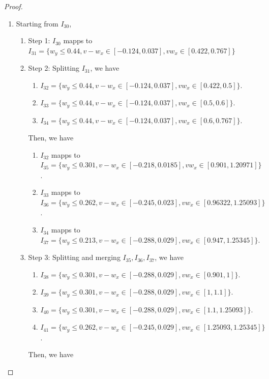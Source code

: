 \documentclass{article}
\theoremstyle{plain}
\theoremstyle{remark}
\begin{document}
\begin{proof}
\begin{enumerate}
    \item Starting from $I_{30}$,
        \begin{enumerate}
        \item Step 1: $I_{30}$ mapps to $I_{31}=\{w_y\le 0.44, v-w_x\in[-0.124, 0.037], vw_x \in[0.422, 0.767]\}$
        \item Step 2: Splitting $I_{31}$, we have
            \begin{enumerate}
                \item $I_{32} = \{w_y\le 0.44, v-w_x\in[-0.124, 0.037], vw_x \in[0.422, 0.5]\}.$
                \item $I_{33} = \{w_y\le 0.44, v-w_x\in[-0.124, 0.037], vw_x \in[0.5, 0.6]\}.$
                \item $I_{34} = \{w_y\le 0.44, v-w_x\in[-0.124, 0.037], vw_x \in[0.6, 0.767]\}.$
            \end{enumerate}
            Then, we have
            \begin{enumerate}
                \item $I_{32}$ mapps to \\ $I_{35} = \{w_y\le 0.301, v-w_x\in[-0.218, 0.0185], vw_x \in[0.901, 1.20971]\}$.
                \item $I_{33}$ mapps to \\ $I_{36} = \{w_y\le 0.262, v-w_x\in[-0.245, 0.023], vw_x \in[0.96322, 1.25093]\}$.
                \item $I_{34}$ mapps to \\ $I_{37} = \{w_y\le 0.213, v-w_x\in[-0.288, 0.029], vw_x \in[0.947, 1.25345]\}$.
            \end{enumerate}
        \item Step 3: Splitting and merging $I_{35},I_{36},I_{37}$, we have
            \begin{enumerate}
                \item $I_{38}=\{w_y\le 0.301, v-w_x\in[-0.288, 0.029], vw_x \in[0.901, 1]\}$.
                \item $I_{39}=\{w_y\le 0.301, v-w_x\in[-0.288, 0.029], vw_x \in[1, 1.1]\}$.
                \item $I_{40}=\{w_y\le 0.301, v-w_x\in[-0.288, 0.029], vw_x \in[1.1, 1.25093]\}$.
                \item $I_{41}=\{w_y\le 0.262, v-w_x\in[-0.245, 0.029], vw_x \in[1.25093, 1.25345]\}$.
            \end{enumerate}
            Then, we have 
            \begin{enumerate}

\end{enumerate}
\end{enumerate}
\end{enumerate}
\end{proof}
\end{document}
